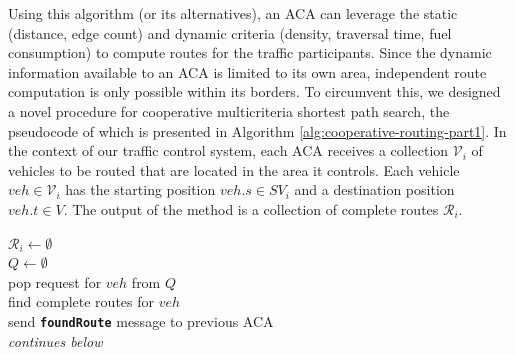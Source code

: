 \documentclass[sigconf]{aamas}
\begin{document}
Using this algorithm (or its alternatives), an ACA can leverage the static (distance, edge count) and dynamic criteria (density, traversal time, fuel consumption) to compute routes for the traffic participants. Since the dynamic information available to an ACA is limited to its own area, independent route computation is only possible within its borders. To circumvent this, we designed a novel procedure for cooperative multicriteria shortest path search, the pseudocode of which is presented in Algorithm \ref{alg:cooperative-routing-part1}. In the context of our traffic control system, each ACA receives a collection $\mathcal{V}_i$ of vehicles to be routed that are located in the area it controls. Each vehicle $veh \in \mathcal{V}_i$ has the starting position $veh.s \in SV_i$ and a destination position $veh.t \in V$. The output of the method is a collection of complete routes $\mathcal{R}_i$.

\begin{algorithm}
    \caption{Cooperative Routing}
    \label{alg:cooperative-routing-part1}
    $\mathcal{R}_i \gets \emptyset$\\
    $Q \gets \emptyset$\\
     {
         {
            pop request for $veh$ from $Q$\\
             {
                find complete routes for $veh$\\
                send \textbf{\texttt{foundRoute}} message to previous ACA\\
            }
        }
    }
    \textit{continues below}\\
\end{algorithm}
\end{document}
